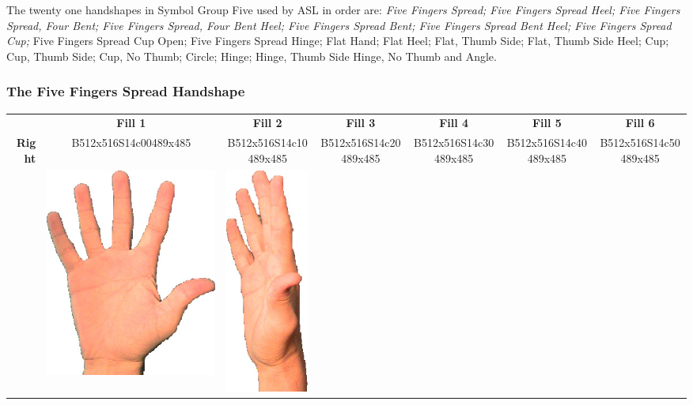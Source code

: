 \documentclass{article}
\begin{document}
The twenty one handshapes in Symbol Group Five used by ASL in order are:
{\it
Five Fingers Spread;
Five Fingers Spread Heel;
Five Fingers Spread, Four Bent;
Five Fingers Spread, Four Bent Heel;
Five Fingers Spread Bent;
Five Fingers Spread Bent Heel;
Five Fingers Spread Cup;
}
Five Fingers Spread Cup Open;
Five Fingers Spread Hinge;
Flat Hand;
Flat Heel;
Flat, Thumb Side;
Flat, Thumb Side Heel;
Cup;
Cup, Thumb Side;
Cup, No Thumb;
Circle;
Hinge;
Hinge, Thumb Side
Hinge, No Thumb
and Angle.

\subsubsection{The Five Fingers Spread Handshape}

\begin{center}
\begin{tabular}{r*{6}{c}}
&\textbf{Fill 1}&\textbf{Fill 2}&\textbf{Fill 3}&\textbf{Fill 4}&\textbf{Fill 5}&\textbf{Fill 6}\\
\multirow{2}{*}{\textbf{Right}}&
B512x516S14c00489x485&
B512x516S14c10489x485&
B512x516S14c20489x485&
B512x516S14c30489x485&
B512x516S14c40489x485&
B512x516S14c50489x485\\
&
\includegraphics[scale=0.1]{images/05-01-1.jpg}&
\includegraphics[scale=0.1]{images/05-01-2.jpg}&

\end{tabular}
\end{center}
\end{document}
